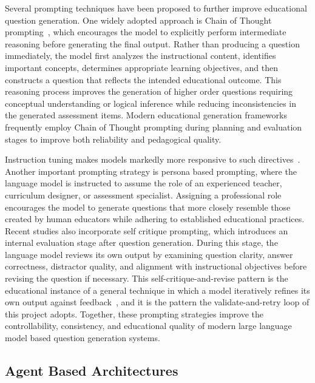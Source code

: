 Several prompting techniques have been proposed to further improve educational question generation. One widely adopted approach is Chain of Thought prompting~\cite{wei2022cot,kojima2022zeroshot}, which encourages the model to explicitly perform intermediate reasoning before generating the final output. Rather than producing a question immediately, the model first analyzes the instructional content, identifies important concepts, determines appropriate learning objectives, and then constructs a question that reflects the intended educational outcome. This reasoning process improves the generation of higher order questions requiring conceptual understanding or logical inference while reducing inconsistencies in the generated assessment items. Modern educational generation frameworks frequently employ Chain of Thought prompting during planning and evaluation stages to improve both reliability and pedagogical quality. \cite{requesta2026}

Instruction tuning makes models markedly more responsive to such directives~\cite{ouyang2022instructgpt}. Another important prompting strategy is persona based prompting, where the language model is instructed to assume the role of an experienced teacher, curriculum designer, or assessment specialist. Assigning a professional role encourages the model to generate questions that more closely resemble those created by human educators while adhering to established educational practices. Recent studies also incorporate self critique prompting, which introduces an internal evaluation stage after question generation. During this stage, the language model reviews its own output by examining question clarity, answer correctness, distractor quality, and alignment with instructional objectives before revising the question if necessary. This
self-critique-and-revise pattern is the educational instance of a general technique in
which a model iteratively refines its own output against feedback~\cite{madaan2023selfrefine,shinn2023reflexion},
and it is the pattern the validate-and-retry loop of this project adopts. Together, these prompting strategies improve the controllability, consistency, and educational quality of modern large language model based question generation systems. \cite{requesta2026}
\subsection{Agent Based Architectures}
\label{sec:back-agent}

